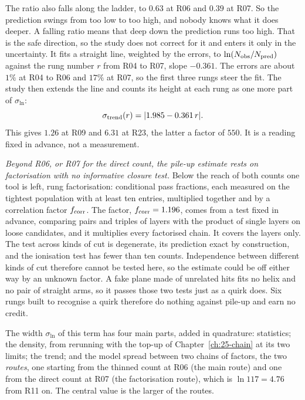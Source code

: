 The ratio also falls along the ladder, to $0.63$ at R06 and $0.39$ at R07. So the prediction swings from too low to too high, and nobody knows what it does deeper. A falling ratio means that deep down the prediction runs too high. That is the safe direction, so the study does not correct for it and enters it only in the uncertainty. It fits a straight line, weighted by the errors, to $\ln(N_{\rm obs}/N_{\rm pred})$ against the rung number $r$ from R04 to R07, slope $-0.361$. The errors are about $1\%$ at R04 to R06 and $17\%$ at R07, so the first three rungs steer the fit. The study then extends the line and counts its height at each rung as one more part of $\sigma_{\ln}$:
\begin{equation}
  \sigma_{\rm trend}(r)=|1.985-0.361\,r| .
  \label{eq:27-trend}
\end{equation}
This gives $1.26$ at R09 and $6.31$ at R23, the latter a factor of $550$. It is a reading fixed in advance, not a measurement.

\emph{Beyond R06, or R07 for the direct count, the pile-up estimate rests on factorisation with no informative closure test.} Below the reach of both counts one tool is left, rung factorisation: conditional pass fractions, each measured on the tightest population with at least ten entries, multiplied together and by a correlation factor $f_{\rm corr}$. The factor, $f_{\rm corr}=1.196$, comes from a test fixed in advance, comparing pairs and triples of layers with the product of single layers on loose candidates, and it multiplies every factorised chain. It covers the layers only. The test across kinds of cut is degenerate, its prediction exact by construction, and the ionisation test has fewer than ten counts. Independence between different kinds of cut therefore cannot be tested here, so the estimate could be off either way by an unknown factor. A fake plane made of unrelated hits fits no helix and no pair of straight arms, so it passes those two tests just as a quirk does. Six rungs built to recognise a quirk therefore do nothing against pile-up and earn no credit.

The width $\sigma_{\ln}$ of this term has four main parts, added in quadrature: statistics; the density, from rerunning with the top-up of Chapter~\ref{ch:25-chain} at its two limits; the trend; and the model spread between two chains of factors, the two \emph{routes}, one starting from the thinned count at R06 (the main route) and one from the direct count at R07 (the factorisation route), which is $\ln117=4.76$ from R11 on. The central value is the larger of the routes.

